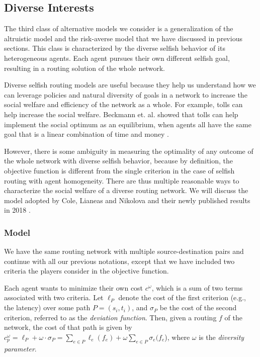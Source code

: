 \subsection{Diverse Interests}\label{sec:diversity}

The third class of alternative models we consider is a generalization of the altruistic model and the risk-averse model that we have discussed in previous sections. This class is characterized by the diverse selfish behavior of its heterogeneous agents. Each agent pursues their own different selfish goal, resulting in a routing solution of the whole network. 

Diverse selfish routing models are useful because they help us understand how we can leverage policies and natural diversity of goals in a network to increase the social welfare and efficiency of the network as a whole. For example, tolls can help increase the social welfare. Beckmann et. al. showed that tolls can help implement the social optimum as an equilibrium, when agents all have the same goal that is a linear combination of time and money \cite{beckmann1956studies}.

However, there is some ambiguity in measuring the optimality of any outcome of the whole network with diverse selfish behavior, because by definition, the objective function is different from the single criterion in the case of selfish routing with agent homogeneity. There are thus multiple reasonable ways to characterize the social welfare of a diverse routing network. We will discuss the model adopted by Cole, Lianeas and Nikolova and their newly published results in 2018 \cite{ijcai2018-24}.

\subsubsection{Model}

We have the same routing network with multiple source-destination pairs and continue with all our previous notations, except that we have included two criteria the players consider in the objective function.

Each agent wants to minimize their own cost $c^\omega$, which is a sum of two terms associated with two criteria. Let $\ell_P$ denote the cost of the first criterion (e.g., the latency) over some path $P=(s_i, t_i)$, and $\sigma_P$ be the cost of the second criterion, referred to as the {\it deviation function}. Then, given a routing $f$ of the network, the cost of that path is given by $c^\omega_p = \ell_P+\omega\cdot \sigma_P=\sum_{e\in P} \ell_e(f_e)+ \omega\sum_{e\in P}\sigma_e(f_e$), where $\omega$ is the {\it diversity parameter}.

